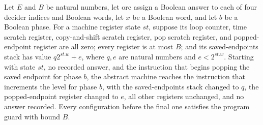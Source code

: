 \begin{theorem}
\label{Complexity.LogProg.SavitchARM.pop_run}
\leanok
{}
Let $E$ and $B$ be natural numbers, let $\mathrm{orc}$ assign a Boolean answer to each
of four decider indices and Boolean words, let $x$ be a Boolean word, and let $b$ be a
Boolean phase. For a machine register state $st$, suppose its loop counter, time scratch
register, copy-and-shift scratch register, pop scratch register, and popped-endpoint
register are all zero; every register is at most $B$; and its saved-endpoints stack has
value $q2^{st.w}+e$, where $q,e$ are natural numbers and $e<2^{st.w}$. Starting with
state $st$, no recorded answer, and the instruction that begins popping the saved
endpoint for phase $b$, the abstract machine reaches the instruction that increments the
level for phase $b$, with the saved-endpoints stack changed to $q$, the popped-endpoint
register changed to $e$, all other registers unchanged, and no answer recorded. Every
configuration before the final one satisfies the program guard with bound $B$.
\end{theorem}
